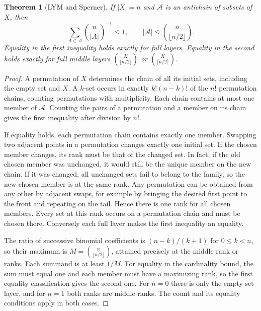 \documentclass[11pt,oneside,openany]{book}
\theoremstyle{plain}
\newtheorem{theorem}{Theorem}[chapter]
\theoremstyle{definition}
\theoremstyle{remark}
\begin{document}
\begin{theorem}[LYM and Sperner]\label{p205:W05}
If \(|X|=n\) and \(\mathcal A\) is an antichain of subsets of \(X\), then
\[
 \sum_{A\in\mathcal A}\binom n{|A|}^{-1}\le1,
 \qquad |\mathcal A|\le\binom n{\lfloor n/2\rfloor}.
\]
Equality in the first inequality holds exactly for full layers.
Equality in the second holds exactly for full middle layers
\(\binom X{\lfloor n/2\rfloor}\) or \(\binom X{\lceil n/2\rceil}\).
\end{theorem}
\begin{proof}
A permutation of \(X\) determines the chain of all its initial
sets, including the empty set and \(X\). A \(k\)-set occurs in
exactly \(k!(n-k)!\) of the \(n!\) permutation chains, counting
permutations with multiplicity. Each chain contains at most one
member of \(\mathcal A\). Counting the pairs of a permutation and
a member on its chain gives the first inequality after division by
\(n!\).

If equality holds, each permutation chain contains exactly one
member. Swapping two adjacent points in a permutation changes
exactly one initial set. If the chosen member changes, its rank
must be that of the changed set. In fact, if the old chosen member
was unchanged, it would still be the unique member on the new
chain. If it was changed, all unchanged sets fail to belong to
the family, so the new chosen member is at the same rank. Any
permutation can be obtained from any other by adjacent swaps,
for example by bringing the desired first point to the front
and repeating on the tail. Hence there is one rank for all
chosen members. Every set at this rank occurs on a permutation
chain and must be chosen there. Conversely each full layer
makes the first inequality an equality.

The ratio of successive binomial coefficients is \((n-k)/(k+1)\)
for \(0\le k<n\), so their maximum is
\(M=\binom n{\lfloor n/2\rfloor}\), attained precisely at the middle
rank or ranks. Each summand is at least \(1/M\). For equality in the
cardinality bound, the sum must equal one and each member must have
a maximizing rank, so the first equality classification gives the
second one. For \(n=0\) there is only the empty-set layer, and for
\(n=1\) both ranks are middle ranks. The count and its equality
conditions apply in both cases.
\end{proof}
\end{document}

